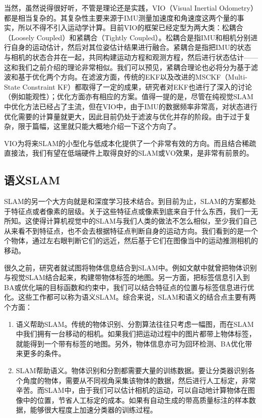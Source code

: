 当然，虽然说得很好听，不管是理论还是实践，VIO（Visual Inertial Odometry）都是相当复杂的。其复杂性主要来源于IMU测量加速度和角速度这两个量的事实，所以不得不引入运动学计算。目前VIO的框架已经定型为两大类：松耦合（Loosely Coupled）和紧耦合（Tightly Coupled）\textsuperscript{\cite{Martinelli2014}}。松耦合是指IMU和相机分别进行自身的运动估计，然后对其位姿估计结果进行融合。紧耦合是指把IMU的状态与相机的状态合并在一起，共同构建运动方程和观测方程，然后进行状态估计——这和我们之前介绍的理论非常相似。我们可以预见，紧耦合理论也必将分为基于滤波和基于优化两个方向。在滤波方面，传统的EKF\textsuperscript{\cite{Bloesch2015}}以及改进的MSCKF（Multi-State Constraint KF）\textsuperscript{\cite{Li2013}}都取得了一定的成果，研究者对EKF也进行了深入的讨论（例如能观性\textsuperscript{\cite{Huang2014}}）；优化方面亦有相应的方案\textsuperscript{\cite{Leutenegger2015, Forster2015}}。值得一提的是，尽管在纯视觉SLAM中优化方法已经占了主流，但在VIO中，由于IMU的数据频率非常高，对状态进行优化需要的计算量就更大，因此目前仍处于滤波与优化并存的阶段\textsuperscript{\cite{Tkocz2015, Usenko2016}}。由于过于复杂，限于篇幅，这里就只能大概地介绍一下这个方向了。

VIO为将来SLAM的小型化与低成本化提供了一个非常有效的方向。而且结合稀疏直接法，我们有望在低端硬件上取得良好的SLAM或VO效果，是非常有前景的。

\subsection{语义SLAM}
SLAM的另一个大方向就是和深度学习技术结合。到目前为止，SLAM的方案都处于特征点或者像素的层级。关于这些特征点或像素到底来自于什么东西，我们一无所知。这使得计算机视觉中的SLAM与我们人类的做法不怎么相似，至少我们自己从来看不到特征点，也不会去根据特征点判断自身的运动方向。我们看到的是一个个物体，通过左右眼判断它们的远近，然后基于它们在图像当中的运动推测相机的移动。

很久之前，研究者就试图将物体信息结合到SLAM中。例如文献\cite{Nuechter2008, Civera2011, Koppula2011, Anand2012}中就曾把物体识别与视觉SLAM结合起来，构建带物体标签的地图。另一方面，把标签信息引入到BA或优化端的目标函数和约束中，我们可以结合特征点的位置与标签信息进行优化\textsuperscript{\cite{Fioraio2013}}。这些工作都可以称为语义SLAM。综合来说，SLAM和语义的结合点主要有两个方面\textsuperscript{\cite{Cadena2016}}：

\begin{enumerate}
	\item 语义帮助SLAM。传统的物体识别、分割算法往往只考虑一幅图，而在SLAM中我们拥有一台移动的相机。如果我们把运动过程中的图片都带上物体标签，就能得到一个带有标签的地图。另外，物体信息亦可为回环检测、BA优化带来更多的条件。 
	\item SLAM帮助语义。物体识别和分割都需要大量的训练数据。要让分类器识别各个角度的物体，需要从不同视角采集该物体的数据，然后进行人工标定，非常辛苦。而SLAM中，由于我们可以估计相机的运动，可以自动地计算物体在图像中的位置，节省人工标定的成本。如果有自动生成的带高质量标注的样本数据，能够很大程度上加速分类器的训练过程。
\end{enumerate}

